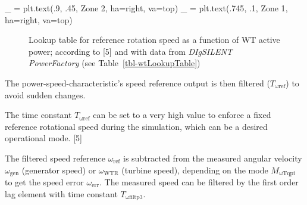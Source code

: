 \documentclass[
  a4paper,
  DIV=11,
  numbers=noendperiod]{scrartcl}
\newenvironment{Shaded}{\begin{snugshade}}{\end{snugshade}}
\newcommand{\FloatTok}[1]{\textcolor[rgb]{0.68,0.00,0.00}{#1}}
\newcommand{\NormalTok}[1]{\textcolor[rgb]{0.00,0.23,0.31}{#1}}
\newcommand{\OperatorTok}[1]{\textcolor[rgb]{0.37,0.37,0.37}{#1}}
\newcommand{\StringTok}[1]{\textcolor[rgb]{0.13,0.47,0.30}{#1}}
\begin{document}
\begin{Shaded}
\begin{Highlighting}[]
\NormalTok{\_ }\OperatorTok{=}\NormalTok{ plt.text(}\FloatTok{.9}\NormalTok{, }\FloatTok{.45}\NormalTok{, }\StringTok{\textquotesingle{}Zone 2\textquotesingle{}}\NormalTok{, ha}\OperatorTok{=}\StringTok{\textquotesingle{}right\textquotesingle{}}\NormalTok{, va}\OperatorTok{=}\StringTok{\textquotesingle{}top\textquotesingle{}}\NormalTok{)}
\NormalTok{\_ }\OperatorTok{=}\NormalTok{ plt.text(}\FloatTok{.745}\NormalTok{, }\FloatTok{.1}\NormalTok{, }\StringTok{\textquotesingle{}Zone 1\textquotesingle{}}\NormalTok{, ha}\OperatorTok{=}\StringTok{\textquotesingle{}right\textquotesingle{}}\NormalTok{, va}\OperatorTok{=}\StringTok{\textquotesingle{}top\textquotesingle{}}\NormalTok{)}
\end{Highlighting}
\end{Shaded}

\begin{figure}[H]


\caption{\label{fig-lookup-table-omega-pref}Lookup table for reference
rotation speed as a function of WT active power; according to {[}5{]}
and with data from \emph{DIgSILENT PowerFactory} (see
Table~\ref{tbl-wtLookupTable})}

\end{figure}%

The power-speed-characteristic's speed reference output is then filtered
(\(T_\mathrm{\omega ref}\)) to avoid sudden changes.

\begin{tcolorbox}[enhanced jigsaw, coltitle=black, bottomrule=.15mm, opacitybacktitle=0.6, rightrule=.15mm, colframe=quarto-callout-note-color-frame, titlerule=0mm, arc=.35mm, breakable, colbacktitle=quarto-callout-note-color!10!white, title=\textcolor{quarto-callout-note-color}{\faInfo}\hspace{0.5em}{Note}, colback=white, bottomtitle=1mm, toprule=.15mm, leftrule=.75mm, toptitle=1mm, left=2mm, opacityback=0]

The time constant \(T_\mathrm{\omega ref}\) can be set to a very high
value to enforce a fixed reference rotational speed during the
simulation, which can be a desired operational mode. {[}5{]}

\end{tcolorbox}

The filtered speed reference \(\omega_\mathrm{ref}\) is subtracted from
the measured angular velocity \(\omega_\text{gen}\) (generator speed) or
\(\omega_\mathrm{WTR}\) (turbine speed), depending on the mode
\(M_\mathrm{\omega Tqpi}\) to get the speed error
\(\omega_\mathrm{err}\). The measured speed can be filtered by the first
order lag element with time constant \(T_\mathrm{\omega filtp3}\).
\end{document}
